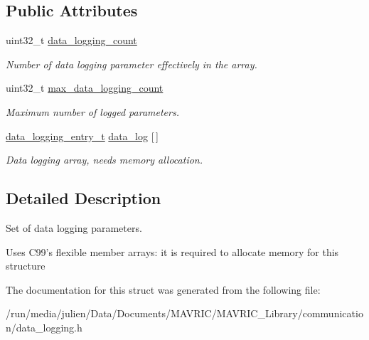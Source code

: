 \subsection*{Public Attributes}
\begin{DoxyCompactItemize}
\item 
\hypertarget{structdata__logging__set__t_a430d1a0e8d689fa86787965f9596afbd}{uint32\+\_\+t \hyperlink{structdata__logging__set__t_a430d1a0e8d689fa86787965f9596afbd}{data\+\_\+logging\+\_\+count}}\label{structdata__logging__set__t_a430d1a0e8d689fa86787965f9596afbd}

\begin{DoxyCompactList}\small\item\em Number of data logging parameter effectively in the array. \end{DoxyCompactList}\item 
\hypertarget{structdata__logging__set__t_a9c1949cea0f9251f78eaa3b25d7e5d3e}{uint32\+\_\+t \hyperlink{structdata__logging__set__t_a9c1949cea0f9251f78eaa3b25d7e5d3e}{max\+\_\+data\+\_\+logging\+\_\+count}}\label{structdata__logging__set__t_a9c1949cea0f9251f78eaa3b25d7e5d3e}

\begin{DoxyCompactList}\small\item\em Maximum number of logged parameters. \end{DoxyCompactList}\item 
\hypertarget{structdata__logging__set__t_ad6c13af70fdb4ae8d5bd2c9f5ad409b7}{\hyperlink{structdata__logging__entry__t}{data\+\_\+logging\+\_\+entry\+\_\+t} \hyperlink{structdata__logging__set__t_ad6c13af70fdb4ae8d5bd2c9f5ad409b7}{data\+\_\+log} \mbox{[}$\,$\mbox{]}}\label{structdata__logging__set__t_ad6c13af70fdb4ae8d5bd2c9f5ad409b7}

\begin{DoxyCompactList}\small\item\em Data logging array, needs memory allocation. \end{DoxyCompactList}\end{DoxyCompactItemize}


\subsection{Detailed Description}
Set of data logging parameters. 

Uses C99's flexible member arrays\+: it is required to allocate memory for this structure 

The documentation for this struct was generated from the following file\+:\begin{DoxyCompactItemize}
\item 
/run/media/julien/\+Data/\+Documents/\+M\+A\+V\+R\+I\+C/\+M\+A\+V\+R\+I\+C\+\_\+\+Library/communication/data\+\_\+logging.\+h\end{DoxyCompactItemize}
